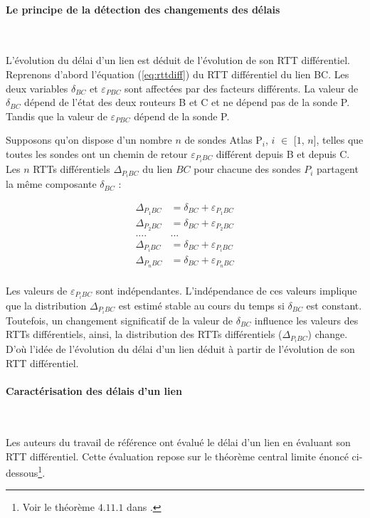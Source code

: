 \paragraph{Le principe de la détection des changements des délais}~

L'évolution du délai d'un lien est déduit de l'évolution de son RTT différentiel. Reprenons d'abord l'équation (\ref{eq:rttdiff}) du RTT différentiel du lien BC. Les deux variables $\delta_{BC}$ et $\varepsilon_{PBC}$ sont affectées par des facteurs différents.
La valeur de  $\delta_{BC}$ dépend de l'état des deux routeurs B et C et ne dépend pas de la sonde P. Tandis que la valeur de $\varepsilon_{PBC}$ dépend de la sonde P.

Supposons qu'on dispose d'un nombre $n$ de sondes Atlas P$_i$, $i$ $\in$ [$1$, $n$], telles que toutes les sondes ont un chemin de retour  $\varepsilon_{P_{i}BC}$ différent depuis B et depuis C.  Les $n$ RTTs différentiels $\Delta_{P{_i}BC}$ du lien $BC$ pour chacune des sondes $P_i$  partagent la même composante $\delta_{BC}$ :


\begin{align*}
\Delta_{P_{1}BC} &= \delta_{BC} + \varepsilon_{P_{1}BC}\\
\Delta_{P_{2}BC} &= \delta_{BC} + \varepsilon_{P_{2}BC}\\
.... &   ... \\
\Delta_{P_{i}BC} &= \delta_{BC} + \varepsilon_{P_{i}BC}\\
\Delta_{P_{n}BC} &= \delta_{BC} + \varepsilon_{P_{n}BC}\\
\end{align*}

Les valeurs de  $\varepsilon_{P_{i}BC}$ sont  indépendantes. L'indépendance de ces valeurs implique que la distribution $\Delta_{P_{i}BC}$ est estimé  stable au cours du temps si $\delta_{BC}$ est constant. Toutefois, un changement significatif de la valeur de $\delta_{BC}$ influence les valeurs des RTTs différentiels, ainsi,  la distribution des RTTs différentiels ($\Delta_{P_{i}BC}$) change. D'où l'idée de l'évolution du délai d'un lien déduit  à partir de l'évolution de son RTT différentiel.

\paragraph{Caractérisation des délais d'un lien}~

Les auteurs du travail de référence  ont évalué le délai d'un lien en évaluant son RTT différentiel. Cette évaluation repose sur le théorème central limite énoncé ci-dessous\footnote{Voir le théorème  $ 4.11.1 $ dans \cite{lefebvre2003cours}.}.


